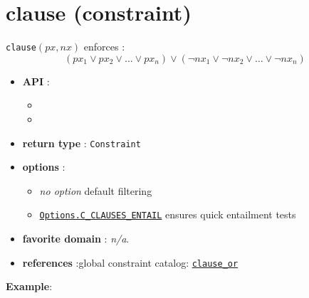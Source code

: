 \label{clause}
\hypertarget{clause}{}

\section{clause (constraint)}\label{clause:clauseconstraint}\hypertarget{clause:clauseconstraint}{}
\begin{notedef}
  \texttt{clause}$(px, nx)$ enforces :
 $$(px_1 \vee px_2 \vee \dots \vee px_n) \vee (\neg nx_1 \vee \neg nx_2 \vee \dots \vee \neg nx_n)$$  
\end{notedef}

\begin{itemize}
	\item \textbf{API} :
	\begin{itemize}
		\item {}
		\item {}
	\end{itemize}
	\item \textbf{return type} : \texttt{Constraint}
	\item \textbf{options} :
	\begin{itemize}
		\item \emph{no option} default filtering
		\item \hyperlink{cclause:cclauseoptions}{\tt Options.C\_CLAUSES\_ENTAIL} ensures quick entailment tests
	\end{itemize}
	\item \textbf{favorite domain} : \emph{n/a}.
	\item \textbf{references} :global constraint catalog: \href{http://www.emn.fr/x-info/sdemasse/gccat/Cclause_or.html}{\tt clause\_or}
\end{itemize}



\textbf{Example}:

